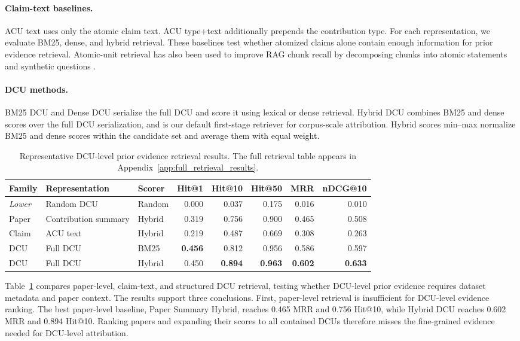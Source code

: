 \documentclass[11pt]{article}
\begin{document}
\paragraph{Claim-text baselines.}
ACU text uses only the atomic claim text.
ACU type+text additionally prepends the contribution type.
For each representation, we evaluate BM25, dense, and hybrid retrieval.
These baselines test whether atomized claims alone contain enough information for prior evidence retrieval.
Atomic-unit retrieval has also been used to improve RAG chunk recall by decomposing chunks into atomic statements and synthetic questions \citep{raina2024question}.
\paragraph{DCU methods.}
BM25 DCU and Dense DCU serialize the full DCU and score it using lexical or dense retrieval.
Hybrid DCU combines BM25 and dense scores over the full DCU serialization, and is our default first-stage retriever for corpus-scale attribution.
Hybrid scores min--max normalize BM25 and dense scores within the candidate set and average them with equal weight.
\begin{table}[t]
\centering
\scriptsize
\setlength{\tabcolsep}{3pt}
\begin{tabular}{lllrrrrr}
\toprule
Family & Representation & Scorer & Hit@1 & Hit@10 & Hit@50 & MRR & nDCG@10 \\
\midrule
\textit{Lower} & Random DCU & Random & 0.000 & 0.037 & 0.175 & 0.016 & 0.010 \\
\midrule
Paper & Contribution summary & Hybrid & 0.319 & 0.756 & 0.900 & 0.465 & 0.508 \\
Claim & ACU text & Hybrid & 0.219 & 0.487 & 0.669 & 0.308 & 0.263 \\
DCU & Full DCU & BM25 & \textbf{0.456} & 0.812 & 0.956 & 0.586 & 0.597 \\
DCU & Full DCU & Hybrid & 0.450 & \textbf{0.894} & \textbf{0.963} & \textbf{0.602} & \textbf{0.633} \\
\bottomrule
\end{tabular}
\caption{Representative DCU-level prior evidence retrieval results. The full retrieval table appears in Appendix~\ref{app:full_retrieval_results}.}
\label{tab:dcu_retrieval}
\end{table}
Table~\ref{tab:dcu_retrieval} compares paper-level, claim-text, and structured DCU retrieval, testing whether DCU-level prior evidence requires dataset metadata and paper context.
The results support three conclusions.
First, paper-level retrieval is insufficient for DCU-level evidence ranking.
The best paper-level baseline, Paper Summary Hybrid, reaches 0.465 MRR and 0.756 Hit@10, while Hybrid DCU reaches 0.602 MRR and 0.894 Hit@10.
Ranking papers and expanding their scores to all contained DCUs therefore misses the fine-grained evidence needed for DCU-level attribution.
\end{document}
